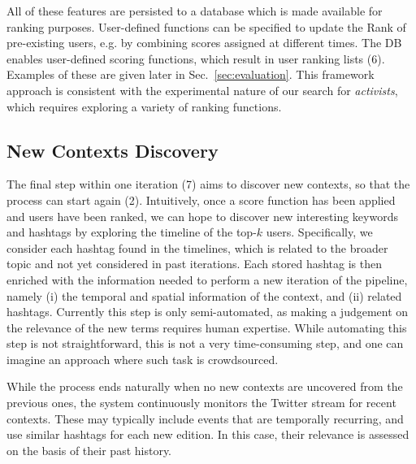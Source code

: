 All of these features are persisted to a database which is made available for ranking purposes.
User-defined functions can be specified to update the Rank of pre-existing users, e.g. by combining scores assigned at different times.
%
The DB enables user-defined scoring functions, which result in user ranking lists (6). Examples of these are given later in Sec.~\ref{sec:evaluation}.
This framework approach is consistent with the experimental nature of our search for \textit{activists}, which requires exploring a variety of ranking functions.

\subsection{New Contexts Discovery} \label{sec:context-discovery}

The final step within one iteration (7) aims to discover new contexts, so that the process can start again (2).
Intuitively, once a score function has been applied and users have been ranked, we can hope to discover new interesting keywords and hashtags by exploring the timeline of the top-$k$ users.
Specifically,  we consider each hashtag found in the timelines, which is related to the broader topic and not yet considered in past iterations.
Each stored hashtag is then enriched with the information needed to perform a new iteration of the pipeline, namely (i) the temporal and spatial information of the context, and (ii) related hashtags.
%
Currently this step is only semi-automated, as making a judgement on the relevance of the new terms requires  human expertise.
While automating this step is not straightforward, this is not a very time-consuming step, and one can imagine an approach where such task is crowdsourced.

While the process ends naturally when no new contexts are uncovered from the previous ones, the system continuously monitors the Twitter stream for recent contexts. These may typically include events that are temporally recurring, and use similar hashtags for each new edition. In this case, their relevance is assessed on the basis of their past history.